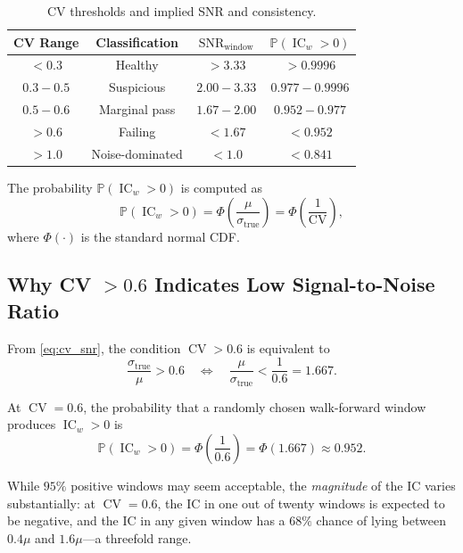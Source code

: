 \documentclass[11pt,a4paper]{article}
\theoremstyle{definition}
\newcommand{\IC}{\operatorname{IC}}
\newcommand{\CV}{\operatorname{CV}}
\newcommand{\Prob}{\mathbb{P}}
\newcommand{\SNR}{\operatorname{SNR}}
\begin{document}
\begin{table}[htbp]
\centering
\caption{CV thresholds and implied SNR and consistency.}
\label{tab:cv}
\begin{tabular}{cccc}
\toprule
CV Range & Classification & $\SNR_{\text{window}}$ & $\Prob(\IC_w > 0)$ \\
\midrule
$< 0.3$  & Healthy    & $> 3.33$ & $> 0.9996$ \\
$0.3{-}0.5$ & Suspicious & $2.00{-}3.33$ & $0.977{-}0.9996$ \\
$0.5{-}0.6$ & Marginal pass & $1.67{-}2.00$ & $0.952{-}0.977$ \\
$> 0.6$  & Failing    & $< 1.67$ & $< 0.952$ \\
$> 1.0$  & Noise-dominated & $< 1.0$ & $< 0.841$ \\
\bottomrule
\end{tabular}
\end{table}

The probability $\Prob(\IC_w > 0)$ is computed as
\begin{equation}
    \Prob(\IC_w > 0) = \Phi\!\left(\frac{\mu}{\sigma_{\text{true}}}\right)
                     = \Phi\!\left(\frac{1}{\CV}\right),
\end{equation}
where $\Phi(\cdot)$ is the standard normal CDF.

\subsection{Why CV \texorpdfstring{$> 0.6$}{> 0.6} Indicates Low Signal-to-Noise Ratio}

From \eqref{eq:cv_snr}, the condition $\CV > 0.6$ is equivalent to
\begin{equation}
    \frac{\sigma_{\text{true}}}{\mu} > 0.6
    \quad\Longleftrightarrow\quad
    \frac{\mu}{\sigma_{\text{true}}} < \frac{1}{0.6} = 1.667.
\end{equation}

At $\CV = 0.6$, the probability that a randomly chosen walk-forward window
produces $\IC_w > 0$ is
\begin{equation}
    \Prob(\IC_w > 0) = \Phi\!\left(\frac{1}{0.6}\right)
                     = \Phi(1.667) \approx 0.952.
\end{equation}

While $95\%$ positive windows may seem acceptable, the \emph{magnitude} of the
IC varies substantially: at $\CV = 0.6$, the IC in one out of twenty windows
is expected to be negative, and the IC in any given window has a $68\%$
chance of lying between $0.4\mu$ and $1.6\mu$---a threefold range.
\end{document}
